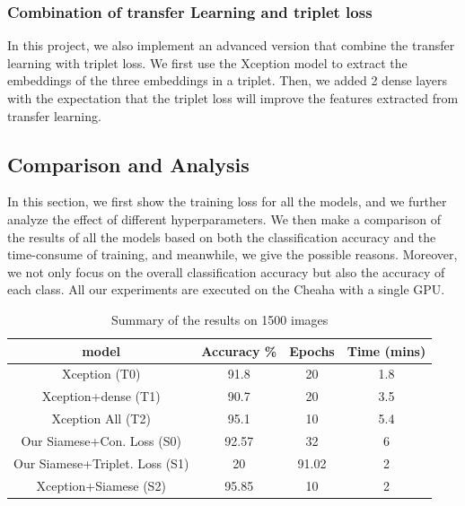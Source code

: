 \subsubsection{Combination of transfer Learning and triplet loss}
In this project, we also implement an advanced version that combine the transfer learning with triplet loss. We first use the Xception model to extract the embeddings of the three embeddings in a triplet. Then, we added 2 dense layers with the expectation that the triplet loss will improve the features extracted from transfer learning.



\subsection{Comparison and Analysis}

In this section, we first show the training loss for all the models, and we further analyze the effect of different hyperparameters. We then make a comparison of the results of all the models based on both the classification accuracy and the time-consume of training, and meanwhile, we give the possible reasons. Moreover, we not only focus on the overall classification accuracy but also the accuracy of each class. All our experiments are executed on the Cheaha with a single GPU. 

\begin{table}[ht]
    \caption{Summary of the results on 1500 images} 
    \centering 
    \begin{tabular}{c c c c} 
    \hline\hline 
    
    model & Accuracy \% & Epochs & Time (mins)  \\%
    \hline %
    Xception (T0) & 91.8 & 20 & 1.8 \\%
    Xception+dense (T1) & 90.7 & 20 & 3.5 \\%
    Xception All (T2) & 95.1 & 10 & 5.4 \\%
    Our Siamese+Con. Loss (S0) & 92.57 & 32 & 6 \\%
    Our Siamese+Triplet. Loss (S1) & 20 & 91.02 & 2 \\%
    Xception+Siamese (S2) & 95.85 & 10 & 2 \\%
    \hline 
    \end{tabular}
\label{table:data} %
\end{table}

